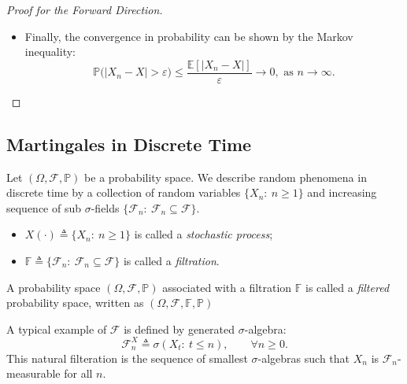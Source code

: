 \begin{proof}[Proof for the Forward Direction]
\begin{itemize}
\begin{align*}
&\le
\mathbb{E}\bigg[
|X-X_n|1_{\{|X_n|>K\}}
\bigg]
+
\mathbb{E}\bigg[
|X|1_{\{|X_n|>K\}}
\bigg]\\
&\le
\mathbb{E}\bigg[
|X-X_n|
\bigg]
+
\mathbb{E}\bigg[
|X|1_{\{|X_n|>K\}}
\bigg]\\
&<\frac{\varepsilon}{2}+\frac{\varepsilon}{2}=\varepsilon.
\end{align*}
where the last inequality is because of the $L^1$-convergence and (\eqref{Eq:3:2:a}).
\item
Finally, the convergence in probability can be shown by the Markov inequality:
\[
\mathbb{P}\bigg(
|X_n-X|>\varepsilon
\bigg)\le
\frac{\mathbb{E}[|X_n-X|]}{\varepsilon}\to0,\text{ as $n\to\infty$}.
\]
\end{itemize}
\end{proof}


\subsection{Martingales in Discrete Time}

\begin{definition}
Let $(\Omega,\mathcal{F},\mathbb{P})$ be a probability space.
We describe random phenomena in discrete time 
by a collection of random variables $\{X_n:~n\ge1\}$ and increasing sequence of
sub $\sigma$-fields $\{\mathcal{F}_n:~\mathcal{F}_n\subseteq\mathcal{F}\}$.
\begin{itemize}
\item
$X(\cdot)\triangleq \{X_n:~n\ge1\}$ is called a \emph{stochastic process};
\item
$\mathbb{F}\triangleq \{\mathcal{F}_n:~\mathcal{F}_n\subseteq\mathcal{F}\}$ is called a \emph{filtration}.
\end{itemize}
A probability space $(\Omega,\mathcal{F},\mathbb{P})$ associated with a filtration $\mathbb{F}$
is called a \emph{filtered} probability space, written as $(\Omega,\mathcal{F},\mathbb{F},\mathbb{P})$
\end{definition}
\begin{remark}
A typical example of $\mathcal{F}$ is defined by generated $\sigma$-algebra:
\[
\mathcal{F}_n^{X}\triangleq\sigma(X_t:~t\le n),\qquad\forall n\ge0.
\]
This natural filteration is the sequence of smallest $\sigma$-algebras such that $X_n$ is $\mathcal{F}_n$-measurable for all $n$.
\end{remark}

